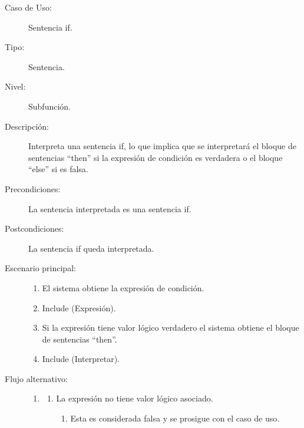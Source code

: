 \begin{framed}
\FloatBarrier
\begin{description}
   \item[Caso de Uso:]  Sentencia if.
   \item [Tipo:] Sentencia.
   \item[Nivel:]  Subfunción.
   \item[Descripción:] 
   Interpreta una sentencia if, lo que implica que se interpretará el 
   bloque de sentencias ``then'' si la expresión de condición es
   verdadera o el bloque ``else'' si es falsa.
   
   \item[Precondiciones:] 
   La sentencia interpretada es una sentencia if.
   \item[Postcondiciones:] 
   La sentencia if queda interpretada.   
   \item[Escenario principal:] \hfill
   \begin{enumerate}
   \item El sistema obtiene la expresión de condición.
   \item Include (Expresión).
   \item Si la expresión tiene valor lógico verdadero el sistema obtiene el bloque de sentencias ``then''.
   \item Include (Interpretar).
   \end{enumerate}
   \item[Flujo alternativo:] \hfill 
   \begin{enumerate} \itemsep1pt \parskip0pt 
   \setcounter{enumi}{2}
   \renewcommand{\labelenumi}{}
   \renewcommand{\labelenumiii}{\arabic{enumiii}.}
   \renewcommand{\labelenumii}{\arabic{enumi}\alph{enumii}.}
      \item 
      \begin {enumerate}
         \setcounter{enumii}{0}
         \item La expresión no tiene valor lógico asociado.
         \begin{enumerate}
         \item Esta es considerada falsa y se prosigue con el caso de uso.  
         \end{enumerate}
      \end{enumerate}
   \end{enumerate}
   \begin{enumerate} \itemsep1pt \parskip0pt 
   \setcounter{enumi}{2}
   \renewcommand{\labelenumi}{}
   \renewcommand{\labelenumiii}{\arabic{enumiii}.}

\end{enumerate}
\end{description}
\end{framed}
